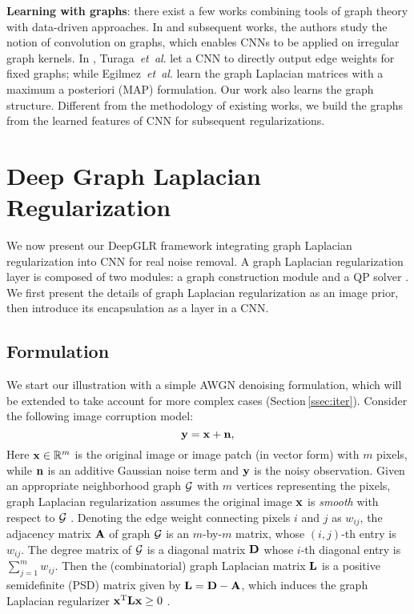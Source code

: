 \documentclass[10pt,twocolumn,letterpaper]{article}
\begin{document}
\textbf{Learning with graphs}:
there exist a few works combining tools of graph theory with data-driven approaches. 
In \cite{kipf2017semi,defferrard2016convolutional} and subsequent works, the authors study the notion of convolution on graphs, which enables CNNs to be applied on irregular graph kernels. 
In \cite{turaga2010convolutional}, Turaga~{\it et~al}. let a CNN to directly output edge weights for fixed graphs; while Egilmez~{\it et~al}. \cite{egilmez2017graph} learn the graph Laplacian matrices with a maximum a posteriori (MAP) formulation. 
Our work also learns the graph structure. 
Different from the methodology of existing works, we build the graphs from the learned features of CNN for subsequent regularizations. 


\section{Deep Graph Laplacian Regularization}\label{sec:glr}
We now present our DeepGLR framework integrating graph Laplacian regularization into CNN for real noise removal. 
A graph Laplacian regularization layer is composed of two modules: a graph construction module \cite{pang2017graph} and a QP solver \cite{amos2017optnet}. 
We first present the details of graph Laplacian regularization \cite{pang2017graph,elmoataz2008nonlocal,hu2016graph} as an image prior, then introduce its encapsulation as a layer in a CNN.

\subsection{Formulation}
\label{ssec:glr_general}
We start our illustration with a simple AWGN denoising formulation, which will be extended to take account for more complex cases (Section\,\ref{ssec:iter}). 
Consider the following image corruption model:
\begin{equation}\label{eq:corrupt}
{\bf y} = {\bf x} + {\bf n},
\end{equation}
Here ${\bf x}\in\mathbb{R}^m$ is the original image or image patch (in vector form) with $m$ pixels, while ${\bf n}$ is an additive Gaussian noise term and ${\bf y}$ is the noisy observation. 
Given an appropriate neighborhood graph ${\cal G}$ with $m$ vertices representing the pixels, graph Laplacian regularization assumes the original image ${\bf x}$ is \emph{smooth} with respect to ${\cal G}$ \cite{shuman2013emerging}. 
Denoting the edge weight connecting pixels $i$ and $j$ as $w_{ij}$, the adjacency matrix ${\bf A}$ of graph ${\cal G}$ is an $m$-by-$m$ matrix, whose $(i,j)$-th entry is $w_{ij}$. 
The degree matrix of ${\cal G}$ is a diagonal matrix ${\bf D}$ whose $i$-th diagonal entry is $\sum\nolimits_{j=1}^{m}{w}_{ij}$. 
Then the (combinatorial) graph Laplacian matrix ${\bf L}$ is a positive semidefinite (PSD) matrix given by ${\bf L} = {\bf D} - {\bf A}$, which induces the graph Laplacian regularizer ${\bf x}^{\rm T}{\bf L}{\bf x}\ge 0$ \cite{shuman2013emerging}. 
\end{document}
